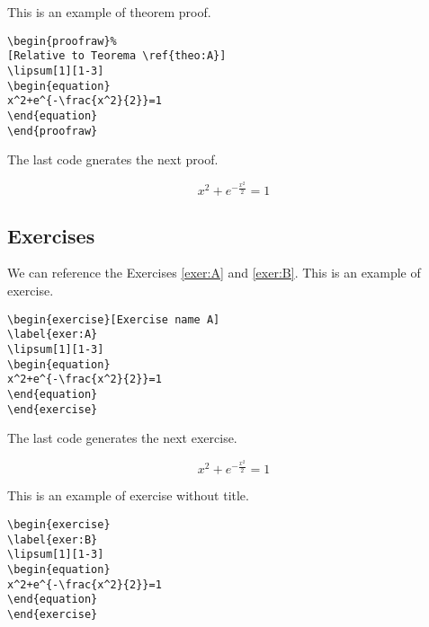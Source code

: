 This is an example of theorem proof.
\begin{highlightbox}
\begin{verbatim}
\begin{proofraw}%
[Relative to Teorema \ref{theo:A}]
\lipsum[1][1-3]
\begin{equation}
x^2+e^{-\frac{x^2}{2}}=1
\end{equation}
\end{proofraw}
\end{verbatim}
\end{highlightbox}

The last code gnerates the next proof.
\begin{proofraw}
\lipsum[1][1-3]
\begin{equation}
x^2+e^{-\frac{x^2}{2}}=1
\end{equation}
\end{proofraw}

\subsection{Exercises}


We can reference the Exercises \ref{exer:A} and \ref{exer:B}.
This is an example of exercise.
\begin{highlightbox}
\begin{verbatim}
\begin{exercise}[Exercise name A]
\label{exer:A}
\lipsum[1][1-3]
\begin{equation}
x^2+e^{-\frac{x^2}{2}}=1
\end{equation}
\end{exercise}
\end{verbatim}
\end{highlightbox}

The last code generates the next exercise.
\begin{exercise}
\label{exer:A}
\lipsum[1][1-3]
\begin{equation}
x^2+e^{-\frac{x^2}{2}}=1
\end{equation}
\end{exercise}

This is an example of exercise without title.
\begin{highlightbox}
\begin{verbatim}
\begin{exercise}
\label{exer:B}
\lipsum[1][1-3]
\begin{equation}
x^2+e^{-\frac{x^2}{2}}=1
\end{equation}
\end{exercise}
\end{verbatim}
\end{highlightbox}

